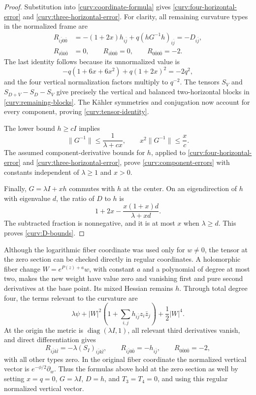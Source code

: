 \begin{proof}
Substitution into \eqref{curv:coordinate-formula} gives
\eqref{curv:four-horizontal-error} and
\eqref{curv:three-horizontal-error}.  For clarity, all remaining
curvature types in the normalized frame are
\begin{equation}\label{curv:remaining-blocks}
 \begin{aligned}
 R_{i\bar j0\bar0}
   &=-(1+2x)h_{i\bar j}
       +q(hG^{-1}h)_{i\bar j}=-D_{i\bar j},\\
 R_{i\bar0k\bar0}&=0,\qquad
 R_{i\bar00\bar0}=0,\qquad
 R_{0\bar00\bar0}=-2.
 \end{aligned}
\end{equation}
The last identity follows because its unnormalized value is
\[
 -q(1+6x+6x^2)+q(1+2x)^2=-2q^2,
\]
and the four vertical normalization factors multiply to $q^{-2}$.
The tensors $S_V$ and $S_{D+V}-S_D-S_V$ give precisely the
vertical and balanced two-horizontal blocks in
\eqref{curv:remaining-blocks}.  The K\"ahler symmetries and
conjugation now account for every component, proving
\eqref{curv:tensor-identity}.

The lower bound $h\ge cI$ implies
\[
 \|G^{-1}\|\le\frac1{\lambda+cx},\qquad
 x^2\|G^{-1}\|\le\frac{x}{c}.
\]
The assumed component-derivative bounds for $h$, applied to
\eqref{curv:four-horizontal-error} and
\eqref{curv:three-horizontal-error}, prove
\eqref{curv:component-errors} with constants independent of
$\lambda\ge1$ and $x>0$.

Finally, $G=\lambda I+xh$ commutes with $h$ at the center.
On an eigendirection of $h$ with eigenvalue $d$, the ratio of $D$
to $h$ is
\[
 1+2x-\frac{x(1+x)d}{\lambda+xd}.
\]
The subtracted fraction is nonnegative, and it is at most $x$
when $\lambda\ge d$.  This proves \eqref{curv:D-bounds}.
\end{proof}

Although the logarithmic fiber coordinate was used only for $w\ne0$,
the tensor at the zero section can be checked directly in regular
coordinates.  A holomorphic fiber change $W=e^{P(z)+a}w$, with
constant $a$ and a polynomial of degree at most two, makes the new
weight have value zero and vanishing first and pure second
derivatives at the base point.  Its mixed Hessian remains $h$.
Through total degree four, the terms relevant to the curvature are
\[
 \lambda\psi+
 |W|^2\left(1+\sum_{i,j}h_{i\bar j}z_i\bar z_j\right)
 +\frac12|W|^4.
\]
At the origin the metric is $\operatorname{diag}(\lambda I,1)$,
all relevant third derivatives vanish, and direct differentiation
gives
\begin{equation}\label{curv:zero-section}
 R_{i\bar j k\bar l}=-\lambda(S_I)_{i\bar j k\bar l},
 \qquad R_{i\bar j0\bar0}=-h_{i\bar j},
 \qquad R_{0\bar00\bar0}=-2,
\end{equation}
with all other types zero.  In the original fiber coordinate the
normalized vertical vector is $e^{-\phi/2}\partial_w$.
Thus the formulas above hold at the zero section as well by setting
$x=q=0$, $G=\lambda I$, $D=h$, and $T_3=T_4=0$, and using this
regular normalized vertical vector.


